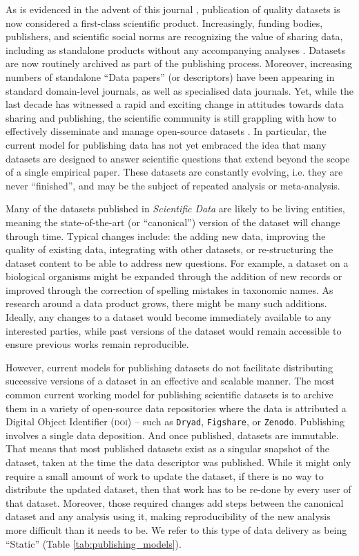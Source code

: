 \documentclass[english]{article}
\begin{document}
As is evidenced in the advent of this journal \cite{Editorial-2014}, publication of quality datasets is now considered a first-class scientific product. Increasingly, funding bodies, publishers, and scientific social norms are recognizing the value of sharing data, including as standalone products without any accompanying analyses \cite{Whitlock-2011,Fairbairn-2011,Piwowar-2011,VanNoorden-2013,Gibney-2013}. Datasets are now routinely archived as part of the publishing process. Moreover, increasing numbers of standalone ``Data papers'' (or descriptors) have been appearing in standard domain-level journals, as well as specialised data journals. Yet, while the last decade has witnessed a rapid and exciting change in attitudes towards data sharing and publishing, the scientific community is still grappling with how to effectively disseminate and manage open-source datasets \cite{Whitlock-2011, Goodman-2014, Lowndes-2017,Perkel-2016,VanNoorden-2013, Kratz-2015}. In particular, the current model for publishing data has not yet embraced the idea that many datasets are designed to answer scientific questions that extend beyond the scope of a single empirical paper. These datasets are constantly evolving, i.e. they are never ``finished'', and may be the subject of repeated analysis or meta-analysis.

Many of the datasets published in \emph{Scientific Data} are likely to be living entities, meaning the state-of-the-art (or ``canonical'') version of the dataset will change through time. Typical changes include: the adding new data, improving the quality of existing data, integrating with other datasets, or re-structuring the dataset content to be able to address new questions. For example, a dataset on a biological organisms might be expanded through the addition of new records or improved through the correction of spelling mistakes in taxonomic names. As research around a data product grows, there might be many such additions. Ideally, any changes to a dataset would become immediately available to any interested parties, while past versions of the dataset would remain accessible to ensure previous works remain reproducible.

However, current models for publishing datasets do not facilitate distributing successive versions of a dataset in an effective and scalable manner. The most common current working model for publishing scientific datasets is to archive them in a variety of open-source data repositories where the data is attributed a Digital Object Identifier (\textsc{doi}) -- such as \texttt{Dryad}, \texttt{Figshare}, or \texttt{Zenodo}. Publishing involves a single data deposition. And once published, datasets are immutable. That means that most published datasets exist as a singular snapshot of the dataset, taken at the time the data descriptor was published. While it might only require a small amount of work to update the dataset, if there is no way to distribute the updated dataset, then that work has to be re-done by every user of that dataset. Moreover, those required changes add steps between the canonical dataset and any analysis using it, making reproducibility of the new analysis more difficult than it needs to be. We refer to this type of data delivery as being ``Static'' (Table \ref{tab:publishing_models}).
\end{document}
